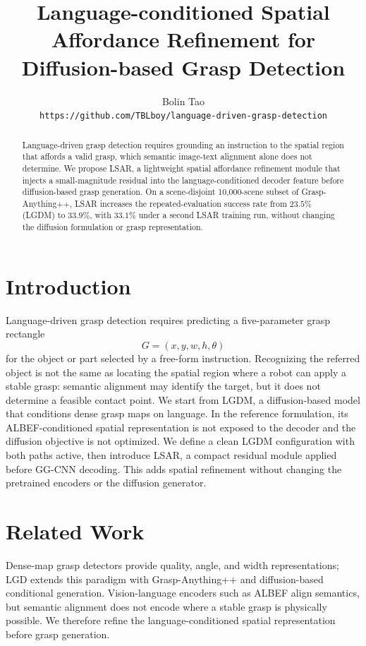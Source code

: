 \documentclass[10pt,twocolumn,letterpaper]{article}
\title{Language-conditioned Spatial Affordance Refinement for Diffusion-based Grasp Detection}
\author{Bolin Tao\\
\texttt{https://github.com/TBLboy/language-driven-grasp-detection}}
\begin{document}
\maketitle

\begin{abstract}
Language-driven grasp detection requires grounding an instruction to the
spatial region that affords a valid grasp, which semantic image-text alignment
alone does not determine.  We propose LSAR, a lightweight spatial affordance
refinement module that injects a small-magnitude residual into the
language-conditioned decoder feature before diffusion-based grasp generation.
On a scene-disjoint 10{,}000-scene subset of Grasp-Anything++, LSAR increases
the repeated-evaluation success rate from $23.5\%$ (LGDM) to $33.9\%$, with
$33.1\%$ under a second LSAR training run, without changing the diffusion
formulation or grasp representation.
\end{abstract}

\section{Introduction}
Language-driven grasp detection requires predicting a five-parameter grasp
rectangle
\begin{equation}
  G=(x, y, w, h, \theta)
\end{equation}
for the object or part selected by a free-form instruction.  Recognizing the
referred object is not the same as locating the spatial region where a robot
can apply a stable grasp: semantic alignment may identify the target, but it
does not determine a feasible contact point.  We start from LGDM, a
diffusion-based model that conditions dense grasp maps on language.  In the
reference formulation, its ALBEF-conditioned spatial representation is not
exposed to the decoder and the diffusion objective is not optimized.  We
define a clean LGDM configuration with both paths active, then introduce
LSAR, a compact residual module applied before GG-CNN decoding.  This adds
spatial refinement without changing the pretrained encoders or the diffusion
generator.

\section{Related Work}
Dense-map grasp detectors \cite{morrison2018closing,kumra2020grconvnet}
provide quality, angle, and width representations; LGD
\cite{vuong2024lgd} extends this paradigm with Grasp-Anything++
\cite{vuong2023graspanything} and diffusion-based conditional generation.
Vision-language encoders such as ALBEF \cite{li2021albef} align semantics, but
semantic alignment does not encode where a stable grasp is physically
possible.  We therefore refine the language-conditioned spatial representation
before grasp generation.
\end{document}
